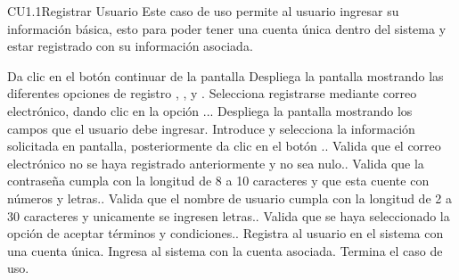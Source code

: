 
% 



	\begin{UseCase}{CU1.1}{Registrar Usuario}{
		Este caso de uso permite al usuario ingresar su información básica, esto para poder tener una cuenta única dentro del sistema y estar registrado con su información asociada. 
	}
	\end{UseCase}
	\begin{UCtrayectoria}
		\UCpaso[\UCactor] Da clic en el botón continuar de la pantalla 
		\UCpaso Despliega la pantalla  mostrando las diferentes opciones de registro , ,  y .
		\UCpaso[\UCactor] Selecciona registrarse mediante correo electrónico, dando clic en la opción ...
		\UCpaso Despliega la pantalla  mostrando los campos que el usuario debe ingresar.
		\UCpaso[\UCactor] Introduce y selecciona la información solicitada en pantalla, posteriormente da clic en el botón .\label{CU1-Registrar}.
		\UCpaso Valida que el correo electrónico no se haya registrado anteriormente y no sea nulo..
		\UCpaso Valida que la contraseña cumpla con la longitud de 8 a 10 caracteres y que esta cuente con números y letras..	
		\UCpaso Valida que el nombre de usuario cumpla con la longitud de 2 a 30 caracteres y unicamente se ingresen letras..
		\UCpaso Valida que se haya seleccionado la opción de aceptar términos y condiciones..
		\UCpaso Registra al usuario en el sistema con una cuenta única.
		\UCpaso Ingresa al sistema con la cuenta asociada.
		\UCpaso[] Termina el caso de uso.
		
	\end{UCtrayectoria}

